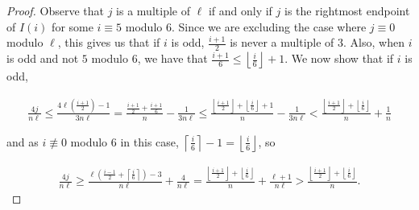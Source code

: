 \documentclass{article}
\theoremstyle{remark}
\theoremstyle{definition}
\begin{document}
\begin{proof}
\par Observe that $j$ is a multiple of $\ell$ if and only if $j$ is the rightmost endpoint of $I(i)$ for some $i \equiv 5$ modulo $6$. Since we are excluding the case where $j \equiv 0$ modulo $\ell$, this gives us that if $i$ is odd, $\frac{i+1}{2}$ is never a multiple of $3$. Also, when $i$ is odd and not $5$ modulo $6$, we have that $\frac{i+1}{6} \leq \left \lfloor \frac{i}{6} \right \rfloor + 1$. We now show that if $i$ is odd,

\begin{align*}
    \frac{4j}{n\ell} \leq \frac{4\ell\left( \frac{i+1}{2} \right)-1}{3n\ell} = \frac{\frac{i+1}{2} + \frac{i+1}{6}}{n}-\frac{1}{3n\ell} \leq \frac{\left \lfloor \frac{i+1}{2}\right \rfloor + \left \lfloor \frac{i}{6} \right \rfloor+1}{n} - \frac{1}{3n\ell} < \frac{\left \lfloor \frac{i+1}{2}\right \rfloor + \left \lfloor \frac{i}{6} \right \rfloor}{n} + \frac{1}{n}
\end{align*}

\par and as $i \not \equiv 0 $ modulo $6$ in this case, $\left \lceil \frac{i}{6} \right \rceil -1 = \left \lfloor \frac{i}{6} \right \rfloor$, so

\begin{align*}
    \frac{4j}{n\ell} \geq \frac{\ell \left(\frac{i-1}{2} + \left \lceil \frac{i}{6} \right \rceil \right) - 3}{n\ell} + \frac{4}{n\ell} = \frac{\left \lfloor \frac{i+1}{2}\right \rfloor + \left \lfloor \frac{i}{6} \right \rfloor}{n} + \frac{\ell+1}{n\ell} > \frac{\left \lfloor \frac{i+1}{2}\right \rfloor + \left \lfloor \frac{i}{6} \right \rfloor}{n}.
\end{align*}
\end{proof}
\end{document}
